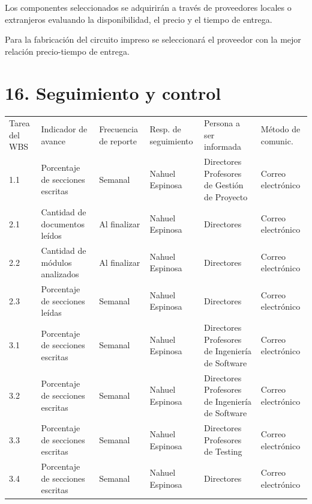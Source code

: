 \documentclass[11pt]{charter}
\begin{document}
Los componentes seleccionados se adquirirán a través de proveedores locales o extranjeros evaluando la disponibilidad, el precio y el tiempo de entrega.

Para la fabricación del circuito impreso se seleccionará el proveedor con la mejor relación precio-tiempo de entrega.

\newpage

\section{16. Seguimiento y control}
\label{sec:seguimiento}

\begin{table}[!htpb]
\centering
\begin{tabularx}{\linewidth}{@{}|m{1.5cm}|m{3cm}|X|X|X|X|@{}}
\hline
\rowcolor[HTML]{C0C0C0} 
\multicolumn{6}{|c|}{\cellcolor[HTML]{C0C0C0}SEGUIMIENTO DE AVANCE} \\ \hline
\rowcolor[HTML]{C0C0C0} 
Tarea del WBS & Indicador de avance & Frecuencia de reporte & Resp. de seguimiento & Persona a ser informada & Método de comunic. \\ \hline
 1.1  & Porcentaje de secciones escritas                   & Semanal      & Nahuel Espinosa & Directores Profesores de Gestión de Proyecto & Correo electrónico \\ \hline
 2.1  & Cantidad de documentos leídos                      & Al finalizar & Nahuel Espinosa & Directores & Correo electrónico \\ \hline
 2.2  & Cantidad de módulos analizados                     & Al finalizar & Nahuel Espinosa & Directores & Correo electrónico \\ \hline
 2.3  & Porcentaje de secciones leídas                     & Semanal      & Nahuel Espinosa & Directores & Correo electrónico \\ \hline
 3.1  & Porcentaje de secciones escritas                   & Semanal      & Nahuel Espinosa & Directores Profesores de Ingeniería de Software & Correo electrónico \\ \hline
 3.2  & Porcentaje de secciones escritas                   & Semanal      & Nahuel Espinosa & Directores Profesores de Ingeniería de Software & Correo electrónico \\ \hline
 3.3  & Porcentaje de secciones escritas                   & Semanal      & Nahuel Espinosa & Directores Profesores de Testing & Correo electrónico \\ \hline
 3.4  & Porcentaje de secciones escritas                   & Semanal      & Nahuel Espinosa & Directores & Correo electrónico \\ \hline

\end{tabularx}
\end{table}
\end{document}

